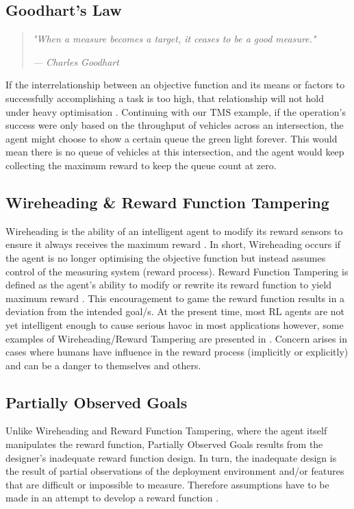 \subsection{Goodhart's Law}
\begin{quotation}
    \textit{"When a measure becomes a target, it ceases to be a good measure."}
    \par \raggedleft\textit{--- Charles Goodhart}
\end{quotation}
If the interrelationship between an objective function and its means or factors to successfully accomplishing a task is too high,
that relationship will not hold under heavy optimisation \cite{Amodei}. 
Continuing with our TMS example, if the operation's success were only based on the throughput of vehicles across an intersection, the agent 
might choose to show a certain queue the green light forever. 
This would mean there is no queue of vehicles at this intersection, and the agent would keep 
collecting the maximum reward to keep the queue count at zero.

\subsection{Wireheading \& Reward Function Tampering}
Wireheading is the ability of an intelligent agent to modify its reward sensors to ensure it always receives the maximum reward \cite{Wireheading} \cite{Amodei}. 
In short, Wireheading occurs if the agent is no longer optimising the objective function but instead assumes control of the measuring system (reward process).
Reward Function Tampering is defined as the agent's ability to modify or rewrite its reward function to yield maximum reward \cite{DBLP:journals/corr/abs-1908-04734}.
This encouragement to game the reward function results in a deviation from the intended goal/s. 
At the present time, most RL agents are not yet intelligent enough to cause serious havoc in most applications however, some examples of Wireheading/Reward Tampering are presented in \cite{DBLP:journals/corr/abs-1908-04734}.  
Concern arises in cases where humans have influence in the reward process (implicitly or explicitly) and can be a danger to themselves and others.

\subsection{Partially Observed Goals}
Unlike Wireheading and Reward Function Tampering, where the agent itself manipulates the reward function, 
Partially Observed Goals results from the designer’s inadequate reward function design.
In turn, the inadequate design is the result of partial observations of the deployment environment and/or features that are difficult or impossible to measure.
Therefore assumptions have to be made in an attempt to develop a reward function \cite{Amodei}.


